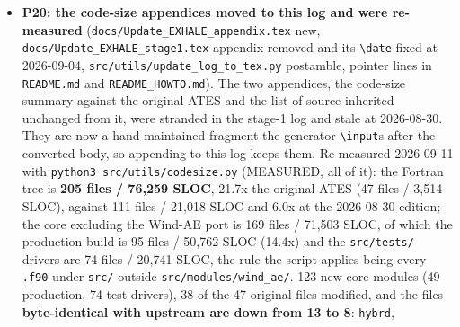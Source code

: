 \documentclass[english,a4paper]{my_memo}
\begin{document}
\begin{itemize}
  and after with no row lost (two renamed:
  \texttt{the\_fixed\_tolerance\_alone\_reports\_the\_base\_cell},
  \texttt{and\_the\_fixed\_reading\_is\_never\_below\_the\_distance}), \texttt{steady\_species\_rows}
  195/0, \texttt{certification} 70/0, \texttt{steady\_completion\_flag} 3/0; a compile RED
  (the entry-text drivers against the delivered objects fail on the missing
  symbol), a semantic RED of the cell-by-cell fact (327/7, P17\textquotesingle s seven rows)
  and a semantic RED of the restatement itself (329/5, the fixture\textquotesingle s floor
  raised into the anchored regime) all discriminate. Impact: the
  \texttt{wasp\_full\_newton} reload gives \texttt{info\ =\ 0}, CERTIFIED, \texttt{\textbar{}\textbar{}R\textbar{}\textbar{}} 1.495e-9,
  \texttt{log10\ Mdot} 13.30 in both builds, all eleven output files byte-identical, the
  two run logs differing in the execution-time line alone. Documents that
  named the deleted function as current fact
  (\texttt{certification\_tolerance\_anchoring\_20260910.md},
  \texttt{session\_handoff\_20260911.md}) were corrected by the advisor.
\item
  \textbf{P20: the code-size appendices moved to this log and were re-measured}
  (\texttt{docs/Update\_EXHALE\_appendix.tex} new, \texttt{docs/Update\_EXHALE\_stage1.tex}
  appendix removed and its \texttt{\textbackslash{}date} fixed at 2026-09-04,
  \texttt{src/utils/update\_log\_to\_tex.py} postamble, pointer lines in \texttt{README.md} and
  \texttt{README\_HOWTO.md}). The two appendices, the code-size summary against the
  original ATES and the list of source inherited unchanged from it, were
  stranded in the stage-1 log and stale at 2026-08-30. They are now a
  hand-maintained fragment the generator \texttt{\textbackslash{}input}s after the converted body,
  so appending to this log keeps them. Re-measured 2026-09-11 with
  \texttt{python3\ src/utils/codesize.py} (MEASURED, all of it): the Fortran tree is
  \textbf{205 files / 76,259 SLOC}, 21.7x the original ATES (47 files / 3,514
  SLOC), against 111 files / 21,018 SLOC and 6.0x at the 2026-08-30 edition;
  the core excluding the Wind-AE port is 169 files / 71,503 SLOC, of which the
  production build is 95 files / 50,762 SLOC (14.4x) and the \texttt{src/tests/}
  drivers are 74 files / 20,741 SLOC, the rule the script applies being every
  \texttt{.f90} under \texttt{src/} outside \texttt{src/modules/wind\_ae/}. 123 new core modules
  (49 production, 74 test drivers), 38 of the 47 original files modified, and
  the files \textbf{byte-identical with upstream are down from 13 to 8}: \texttt{hybrd},

\end{itemize}
\end{document}
